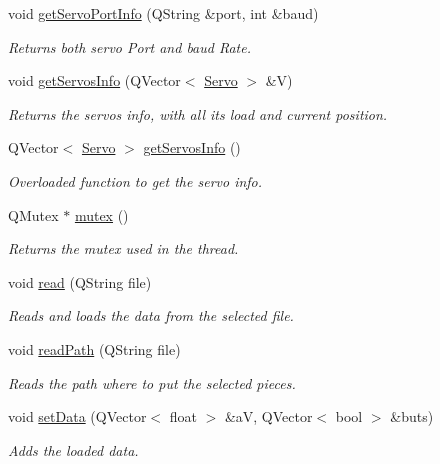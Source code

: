 \begin{DoxyCompactItemize}
void \hyperlink{a00008_afcf834d93f1ac9663d6ebaab820e5f74}{get\+Servo\+Port\+Info} (Q\+String \&port, int \&baud)
\begin{DoxyCompactList}\small\item\em Returns both servo Port and baud Rate. \end{DoxyCompactList}\item 
void \hyperlink{a00008_a5fd8ef13314428f5ba7646730cc58f1c}{get\+Servos\+Info} (Q\+Vector$<$ \hyperlink{a00007}{Servo} $>$ \&V)
\begin{DoxyCompactList}\small\item\em Returns the servos info, with all its load and current position. \end{DoxyCompactList}\item 
Q\+Vector$<$ \hyperlink{a00007}{Servo} $>$ \hyperlink{a00008_a3d58189cdeddfb828856f192607f68d2}{get\+Servos\+Info} ()
\begin{DoxyCompactList}\small\item\em Overloaded function to get the servo info. \end{DoxyCompactList}\item 
Q\+Mutex $\ast$ \hyperlink{a00008_a82d074ab2c445470a6f49e2935bf6a8e}{mutex} ()
\begin{DoxyCompactList}\small\item\em Returns the mutex used in the thread. \end{DoxyCompactList}\item 
void \hyperlink{a00008_aaa60ec35320c1c3de691f3a00cd638cb}{read} (Q\+String file)
\begin{DoxyCompactList}\small\item\em Reads and loads the data from the selected file. \end{DoxyCompactList}\item 
void \hyperlink{a00008_ae236c55f7d673653d329e1655df349a2}{read\+Path} (Q\+String file)
\begin{DoxyCompactList}\small\item\em Reads the path where to put the selected pieces. \end{DoxyCompactList}\item 
void \hyperlink{a00008_a8497ea56991b620981ce1fbf53d9ebdb}{set\+Data} (Q\+Vector$<$ float $>$ \&a\+V, Q\+Vector$<$ bool $>$ \&buts)
\begin{DoxyCompactList}\small\item\em Adds the loaded data. \end{DoxyCompactList}\item 

\end{DoxyCompactItemize}
